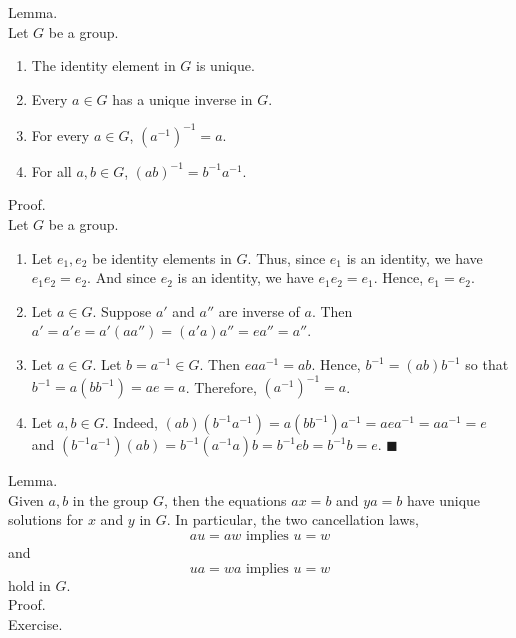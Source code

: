 \documentclass[twocolumn]{article}
\newcommand{\qed}{$\blacksquare$}
\newcommand{\br}{\vspace{\baselineskip}}
\begin{document}
Lemma. \\
Let $G$ be a group.
\begin{enumerate}
	\item
	The identity element in $G$ is unique.
	\item
	Every $a \in G$ has a unique inverse in $G$.
	\item
	For every $a \in G$, $(a^{-1})^{-1} = a$.
	\item
	For all $a, b \in G$, $(ab)^{-1} = b^{-1}a^{-1}$.
\end{enumerate}
Proof. \\
Let $G$ be a group.
\begin{enumerate}
	\item
	Let $e_1, e_2$ be identity elements in $G$. Thus, since $e_1$ is an identity, we have $e_1e_2 = e_2$. And since $e_2$ is an identity, we have $e_1e_2 = e_1$. Hence, $e_1 = e_2$.
	\item
	Let $a \in G$. Suppose $a'$ and $a''$ are inverse of $a$. Then $a' = a'e = a'(aa'') = (a'a)a'' = ea'' = a''$.
	\item
	Let $a \in G$. Let $b = a^{-1} \in G$. Then $e aa^{-1} = ab$. Hence, $b^{-1} = (ab)b^{-1}$ so that $b^{-1} = a(bb^{-1}) = ae = a$. Therefore, $(a^{-1})^{-1} = a$.
	\item
	Let $a, b \in G$. Indeed, $(ab)(b^{-1}a^{-1}) = a(bb^{-1})a^{-1} = aea^{-1} = aa^{-1} = e$ and $(b^{-1}a^{-1})(ab) = b^{-1}(a^{-1}a)b = b^{-1}eb = b^{-1}b = e$. \qed
\end{enumerate} \br

Lemma. \\
Given $a, b$ in the group $G$, then the equations $ax = b$ and $ya = b$ have unique solutions for $x$ and $y$ in $G$. In particular, the two cancellation laws,
$$au = aw \text{ implies } u = w$$
and
$$ua = wa \text{ implies } u = w$$
hold in $G$. \\
Proof. \\
Exercise. \\
\end{document}
